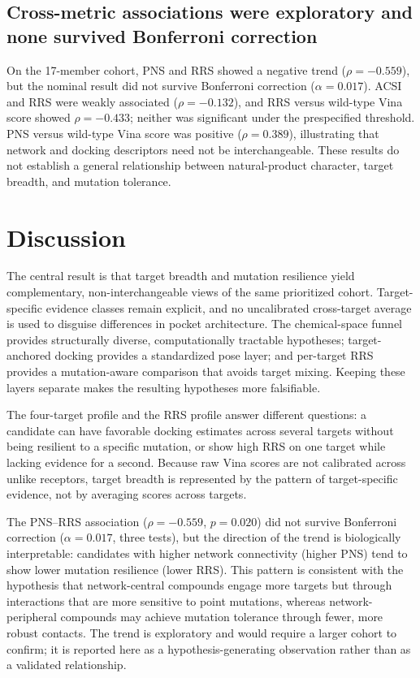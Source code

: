 \documentclass[journal=jcisd8,manuscript=article]{achemso}
\begin{document}
\subsection{Cross-metric associations were exploratory and none survived Bonferroni correction}
On the 17-member cohort, PNS and RRS showed a negative trend ($\rho=-\num{0.559}$), but the nominal result did not survive Bonferroni correction ($\alpha=\num{0.017}$). ACSI and RRS were weakly associated ($\rho=-\num{0.132}$), and RRS versus wild-type Vina score showed $\rho=-\num{0.433}$; neither was significant under the prespecified threshold. PNS versus wild-type Vina score was positive ($\rho=\num{0.389}$), illustrating that network and docking descriptors need not be interchangeable. These results do not establish a general relationship between natural-product character, target breadth, and mutation tolerance.

\section{Discussion}
The central result is that target breadth and mutation resilience yield complementary, non-interchangeable views of the same prioritized cohort. Target-specific evidence classes remain explicit, and no uncalibrated cross-target average is used to disguise differences in pocket architecture. The chemical-space funnel provides structurally diverse, computationally tractable hypotheses; target-anchored docking provides a standardized pose layer; and per-target RRS provides a mutation-aware comparison that avoids target mixing. Keeping these layers separate makes the resulting hypotheses more falsifiable.

The four-target profile and the RRS profile answer different questions: a candidate can have favorable docking estimates across several targets without being resilient to a specific mutation, or show high RRS on one target while lacking evidence for a second. Because raw Vina scores are not calibrated across unlike receptors, target breadth is represented by the pattern of target-specific evidence, not by averaging scores across targets.

The PNS--RRS association ($\rho=-\num{0.559}$, $p=\num{0.020}$) did not survive Bonferroni correction ($\alpha=\num{0.017}$, three tests), but the direction of the trend is biologically interpretable: candidates with higher network connectivity (higher PNS) tend to show lower mutation resilience (lower RRS). This pattern is consistent with the hypothesis that network-central compounds engage more targets but through interactions that are more sensitive to point mutations, whereas network-peripheral compounds may achieve mutation tolerance through fewer, more robust contacts. The trend is exploratory and would require a larger cohort to confirm; it is reported here as a hypothesis-generating observation rather than as a validated relationship.
\end{document}
